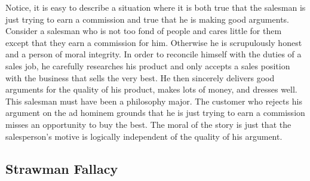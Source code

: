 
Notice, it is easy to describe a situation where it is both true that the salesman is just trying to earn a commission and true that he is making good arguments. Consider a salesman who is not too fond of people and cares little for them except that they earn a commission for him. Otherwise he is scrupulously honest and a person of moral integrity. In order to reconcile himself with the duties of a sales job, he carefully researches his product and only accepts a sales position with the business that sells the very best. He then sincerely delivers good arguments for the quality of his product, makes lots of money, and dresses well. This salesman must have been a philosophy major. The customer who rejects his argument on the ad hominem grounds that he is just trying to earn a commission misses an opportunity to buy the best. The moral of the story is just that the salesperson’s motive is logically independent of the quality of his argument.
\subsection{Strawman Fallacy}

